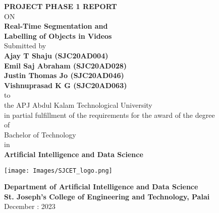 
\setcounter{page}{1}


\newpage
\thispagestyle{empty}
\begin{center}
  {\large \bf PROJECT PHASE 1 REPORT}\\
ON\\
  {\huge \bf Real-Time Segmentation and}\\
   \vspace{0.5 cm}
   {\huge \bf Labelling of Objects in Videos}\\
   \large Submitted by\\
   { \bf Ajay T Shaju (SJC20AD004)}\\
   { \bf Emil Saj Abraham (SJC20AD028)}\\
   { \bf Justin Thomas Jo (SJC20AD046)}\\
   { \bf Vishnuprasad K G (SJC20AD063)}\\[-0.6mm]
  {\large to\\[-0.6mm] the APJ Abdul Kalam Technological University\\[-0.6mm] in partial fulfillment of the requirements for the award of the degree\\[-0.6mm] of\\[-0.6mm] Bachelor of Technology\\[-0.6mm] in\\[-0.6mm] {\bf Artificial Intelligence and Data Science}}
  
   \begin{center}
   \texttt{[image: Images/SJCET\_logo.png]}
   \end{center}

  {\large {\bf Department of Artificial Intelligence and Data Science}\\
          [-3mm] {\bf St. Joseph's College of Engineering and Technology, Palai}\\
           [1mm]  December : 2023}

\end{center}
\newpage
\thispagestyle{empty}
